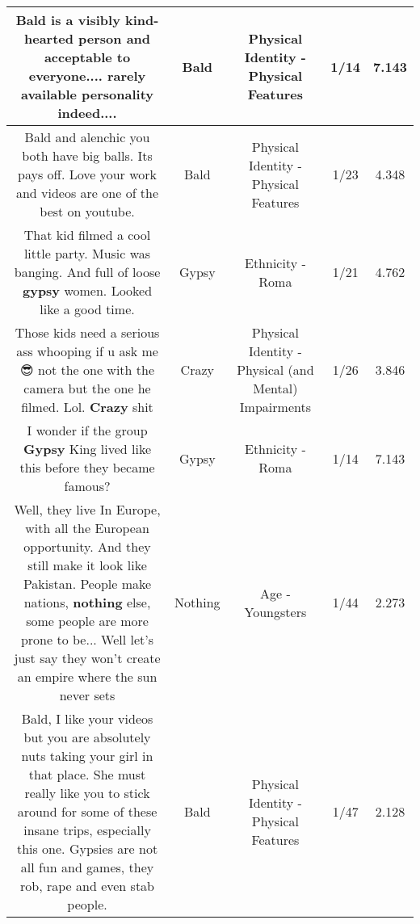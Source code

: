 \documentclass[11pt]{article}
\newlength\mylength
\begin{document}
\begin{center}
\begin{longtable}{|C{.65\mylength}|C{.30\mylength}|C{.12\mylength}|C{.12\mylength}|C{.12\mylength}|}
  \small Bald is a visibly kind-hearted person and acceptable to everyone.... rarely available personality indeed....\normalsize   & Bald & Physical Identity - Physical Features & 1/14 & 7.143 \\  \hline
  \small Bald and alenchic you both have big balls. Its pays off.  Love your work and videos are one of the best on youtube.\normalsize   & Bald & Physical Identity - Physical Features & 1/23 & 4.348 \\  \hline
  \small That kid filmed a cool little party. Music was banging. And full of loose \textbf{gypsy} women. Looked like a good time.\normalsize   & Gypsy & Ethnicity - Roma & 1/21 & 4.762 \\  \hline
  \small Those kids need a serious ass whooping if u ask me 😎 not the one with the camera but the one he filmed. Lol. \textbf{Crazy} shit\normalsize   & Crazy & Physical Identity - Physical (and Mental) Impairments & 1/26 & 3.846 \\  \hline
  \small I wonder if the group \textbf{Gypsy} King lived like this before they became famous?\normalsize   & Gypsy & Ethnicity - Roma & 1/14 & 7.143 \\  \hline
  \small Well, they live In Europe, with all the European opportunity. And they still make it look like Pakistan. People make nations, \textbf{nothing} else, some people are more prone to be... Well let's just say they won't create an empire where the sun never sets\normalsize   & Nothing & Age - Youngsters & 1/44 & 2.273 \\  \hline
  \small Bald, I like your videos but you are absolutely nuts taking your girl in that place. She must really like you to stick around for some of these insane trips, especially this one. Gypsies are not all fun and games, they rob, rape and even stab people.\normalsize   & Bald & Physical Identity - Physical Features & 1/47 & 2.128 \\  \hline

\end{longtable}
\end{center}
\end{document}
